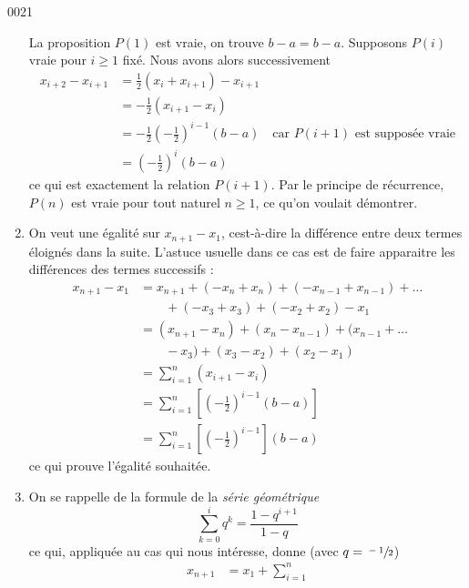 \begin{corrige}{0021}
\begin{enumerate}
  La proposition $P(1)$ est vraie, on trouve $b-a = b-a$. Supposons
  $P(i)$ vraie pour $i \geq 1$ fixé. Nous avons alors successivement
  \begin{equation*}
    \begin{split}
      x_{i+2} - x_{i+1} &= \frac12 (x_{i} + x_{i+1}) - x_{i+1}\\
      &= -\frac12 \left(x_{i+1} - x_i\right)\\
      &= -\frac12 {\left(-\frac12\right)}^{i-1} (b-a) \quad\text{car } P(i+1) \text{ est supposée vraie}\\
      &= {\left(-\frac12\right)}^{i} (b-a)
    \end{split}
  \end{equation*}
  ce qui est exactement la relation $P(i+1)$. Par le principe de
  récurrence, $P(n)$ est vraie pour tout naturel $n \geq 1$, ce qu'on
  voulait démontrer.
\item On veut une égalité sur $x_{n+1} - x_1$, cest-à-dire la
  différence entre deux termes éloignés dans la suite. L'astuce
  usuelle dans ce cas est de faire apparaitre les différences des
  termes successifs :
  \begin{equation*}
    \begin{split}
      x_{n+1} - x_1 &= x_{n+1} + (- x_n + x_n) + (- x_{n-1} + x_{n-1})
      + \ldots\\
      & \qquad + (- x_3 + x_3) + (- x_2 + x_2) - x_1\\
      &= (x_{n+1} - x_n) + (x_n - x_{n-1}) + (x_{n-1} + \ldots\\
      & \qquad - x_3) + (x_3 - x_2) + (x_2 - x_1)\\
      &= \sum_{i=1}^n (x_{i+1} - x_i)\\
      &= \sum_{i=1}^n \left[{\left(-\frac12\right)}^{i-1} (b-a)\right]\\
      &= \sum_{i=1}^n \left[{\left(-\frac12\right)}^{i-1}\right] (b-a)
    \end{split}
  \end{equation*}
  ce qui prouve l'égalité souhaitée.
\item On se rappelle de la formule de la \emph{série géométrique}
  \begin{equation*}
    \sum_{k=0}^i q^k = \frac{1 - q^{i+1}}{1 - q}
  \end{equation*}
  ce qui, appliquée au cas qui nous intéresse, donne (avec $q =
  \sfrac{-1}2$)
  \begin{equation*}
    \begin{split}
      x_{n+1} &= x_1 + \sum_{i=1}^n

\end{split}
\end{equation*}
\end{enumerate}
\end{corrige}
